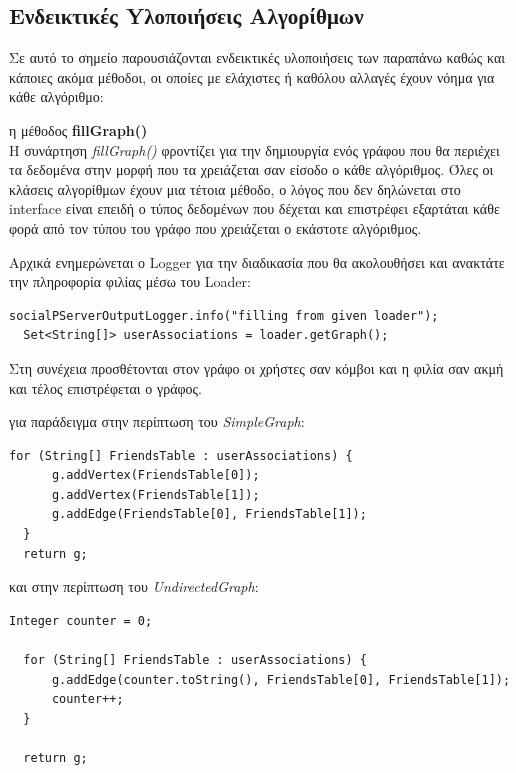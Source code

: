 \subsection{Eνδεικτικές Yλοποιήσεις Αλγορίθμων}
\noindent
Σε αυτό το σημείο παρουσιάζονται ενδεικτικές υλοποιήσεις των παραπάνω καθώς και κάποιες ακόμα μέθοδοι, οι οποίες με ελάχιστες ή καθόλου αλλαγές έχουν νόημα για κάθε αλγόριθμο:
\begin{description}

  
\item η μέθοδος \textbf{fillGraph()}\hfill \\
Η συνάρτηση \emph{fillGraph()} φροντίζει για την δημιουργία ενός γράφου που θα περιέχει τα δεδομένα στην μορφή που τα χρειάζεται σαν είσοδο
ο κάθε αλγόριθμος. Όλες οι κλάσεις αλγορίθμων έχουν μια τέτοια μέθοδο, ο λόγος που δεν δηλώνεται στο interface είναι επειδή ο τύπος δεδομένων 
που δέχεται και επιστρέφει εξαρτάται κάθε φορά
από τον τύπου του γράφο που χρειάζεται ο εκάστοτε αλγόριθμος.

Αρχικά ενημερώνεται ο Logger για την διαδικασία που θα ακολουθήσει και ανακτάτε την πληροφορία φιλίας μέσω του Loader:
\begin{lstlisting}[frame=single]
  socialPServerOutputLogger.info("filling from given loader");                
  Set<String[]> userAssociations = loader.getGraph(); 
\end{lstlisting}   
Στη συνέχεια προσθέτονται στον γράφο οι χρήστες σαν κόμβοι και η φιλία σαν ακμή και τέλος επιστρέφεται ο γράφος.
  \begin{description}
    \item για παράδειγμα στην περίπτωση του \emph{SimpleGraph}:
\begin{lstlisting}[frame=single]
  for (String[] FriendsTable : userAssociations) {  
      g.addVertex(FriendsTable[0]);
      g.addVertex(FriendsTable[1]);
      g.addEdge(FriendsTable[0], FriendsTable[1]);
  }
  return g;
\end{lstlisting}     
  \item και στην περίπτωση του \emph{UndirectedGraph}:
\begin{lstlisting}[frame=single]
  Integer counter = 0;

  for (String[] FriendsTable : userAssociations) {
      g.addEdge(counter.toString(), FriendsTable[0], FriendsTable[1]);
      counter++;
  }
  
  return g;
\end{lstlisting}   
  \end{description}  


\end{description}
